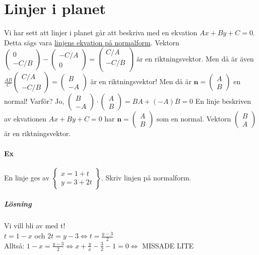 \section{Linjer i planet}
Vi har sett att linjer i planet går att beskriva med en ekvation $Ax+By+C=0$.
Detta sägs vara \underline{linjens ekvation på normalform}.
Vektorn $\begin{pmatrix}0\\-C/B\end{pmatrix}-\begin{pmatrix}-C/A\\0\end{pmatrix}=\begin{pmatrix}C/A\\-C/B\\\end{pmatrix}$ är en riktningsvektor. 
Men då är även $\frac{AB}{C}\begin{pmatrix}C/A\\-C/B\end{pmatrix}=\begin{pmatrix}B\\-A\end{pmatrix}$ är en riktningsvektor!
Men då är $\bm{n}=\begin{pmatrix}A\\B\end{pmatrix}$ en normal!
Varför? Jo, $\begin{pmatrix}B\\-A\end{pmatrix}\cdot \begin{pmatrix}A\\B\end{pmatrix}=BA+(-A)B=0$
En linje beskriven av ekvationen $Ax+By+C=0$ har $\bm{n}=\begin{pmatrix}A\\B\end{pmatrix}$ som en normal.
Vektorn $\begin{pmatrix}B\\A\end{pmatrix}$ är en riktningsvektor.

\paragraph{Ex} En linje ges av $\left\lbrace\begin{matrix}
    x=1+t\\y=3+2t
\end{matrix}\right\rbrace$.
Skriv linjen på normalform.
\subparagraph{Lösning} Vi vill bli av med t!\\
$t=1-x$ och $2t=y-3\Leftrightarrow t=\frac{y-3}{2}$\\
Alltså: $1-x=\frac{y-3}{2}\Leftrightarrow x+\frac{y}{x}-\frac{3}{2}-1=0\Leftrightarrow $ MISSADE LITE

